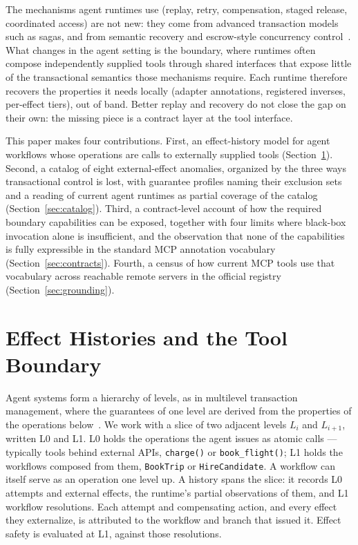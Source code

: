 \documentclass{article}
\begin{document}
The mechanisms agent runtimes use (replay, retry, compensation, staged release, coordinated access) are not new: they come from advanced
transaction models such as sagas, and from semantic recovery and
escrow-style concurrency
control~\cite{garcia1987sagas,korth1990formal,elmagarmid1992transaction,weikum2001transactional,oneil1986escrow}.
What changes in the agent setting is the boundary, where runtimes often
compose independently supplied tools through shared interfaces that expose
little of the transactional semantics those mechanisms require. Each runtime
therefore recovers the properties it needs locally (adapter annotations, registered inverses, per-effect tiers), out of band. Better replay and recovery do not close the gap on their
own: the missing piece is a contract layer at the tool interface.

This paper makes four contributions. First, an effect-history model for
agent workflows whose operations are calls to externally supplied tools
(Section~\ref{sec:model}). Second, a catalog of eight external-effect
anomalies, organized by the three ways transactional control is lost, with
guarantee profiles naming their exclusion sets and a reading of current agent
runtimes as partial coverage of the catalog (Section~\ref{sec:catalog}).
Third, a contract-level account of how the required boundary capabilities
can be exposed, together with four limits where black-box invocation alone is
insufficient, and the observation that none of the capabilities is fully
expressible in the standard MCP annotation vocabulary
(Section~\ref{sec:contracts}). Fourth, a census of how current MCP tools use
that vocabulary across reachable remote servers in the official registry
(Section~\ref{sec:grounding}).

\section{Effect Histories and the Tool Boundary}
\label{sec:model}

Agent systems form a hierarchy of levels, as in multilevel transaction
management, where the guarantees of one level are derived from the properties of
the operations below~\cite{weikum1991principles}. We work with a slice of
two adjacent levels $L_i$ and $L_{i+1}$, written L0 and L1. L0 holds the
operations the agent issues as atomic calls --- typically tools behind
external APIs, \texttt{charge()} or \texttt{book\_flight()}; L1 holds the
workflows composed from them, \texttt{BookTrip} or \texttt{HireCandidate}.
A workflow can itself serve as an operation one level up. A history spans the
slice: it records L0 attempts and external effects, the runtime's partial
observations of them, and L1 workflow resolutions. Each attempt and
compensating action, and every effect they externalize, is attributed to the
workflow and branch that issued it. Effect safety is evaluated at L1, against
those resolutions.
\end{document}
